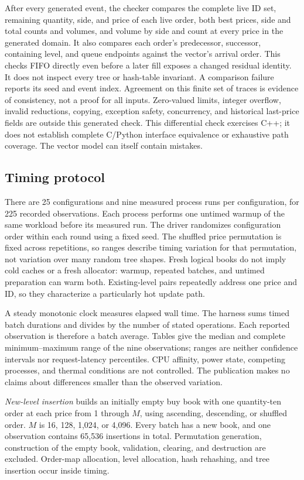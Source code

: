 \documentclass[10pt,letterpaper,twocolumn]{article}
\begin{document}
After every generated event, the checker compares the complete live ID set,
remaining quantity, side, and price of each live order, both best prices,
side and total counts and volumes, and volume by side and count at every
price in the generated domain. It also compares each order's predecessor,
successor, containing level, and queue endpoints against the vector's arrival
order. This checks FIFO directly even before a later fill exposes a changed
residual identity. It does not inspect every tree or hash-table invariant.
A comparison failure reports its seed and event index.
Agreement on this finite set of traces is evidence of consistency, not a proof
for all inputs. Zero-valued limits, integer overflow, invalid reductions,
copying, exception safety, concurrency, and historical last-price fields are
outside this generated check. This differential check exercises C++; it does
not establish complete C/Python interface equivalence or exhaustive path
coverage. The vector model can itself contain mistakes.

\subsection{Timing protocol}
There are 25 configurations and nine measured process runs per configuration,
for 225 recorded observations. Each process performs one untimed warmup of
the same workload before its measured run. The driver randomizes configuration
order within each round using a fixed seed. The shuffled price permutation
is fixed across repetitions, so ranges describe timing variation for that
permutation, not variation over many random tree shapes. Fresh logical books
do not imply cold caches or a fresh allocator: warmup, repeated batches, and
untimed preparation can warm both. Existing-level pairs repeatedly address
one price and ID, so they characterize a particularly hot update path.

A steady monotonic clock measures elapsed wall time. The harness sums timed
batch durations and divides by the number of stated operations. Each reported
observation is therefore a batch average. Tables give the median and complete
minimum--maximum range of the nine observations; ranges are neither confidence
intervals nor request-latency percentiles. CPU affinity, power state, competing
processes, and thermal conditions are not controlled. The publication makes
no claims about differences smaller than the observed variation.

\emph{New-level insertion} builds an initially empty buy book with one
quantity-ten order at each price from 1 through $M$, using ascending,
descending, or shuffled order. $M$ is 16, 128, 1,024, or 4,096. Every batch
has a new book, and one observation contains 65,536 insertions in total.
Permutation generation, construction of the empty book, validation, clearing,
and destruction are excluded. Order-map allocation, level allocation, hash
rehashing, and tree insertion occur inside timing.
\end{document}
